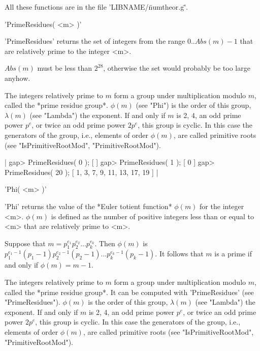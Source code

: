 All these functions are in the file 'LIBNAME/\"numtheor.g\"'.

%

'PrimeResidues( <m> )'

'PrimeResidues' returns the set of integers  from the range $0..Abs(m)-1$
that are relatively prime to the integer <m>.

$Abs(m)$ must be less than $2^{28}$, otherwise the set would probably  be
too large anyhow.

The integers  relatively prime to $m$ form  a group  under multiplication
modulo $m$,  called the *prime residue group*.   $\phi(m)$ (see "Phi") is
the order  of this  group, $\lambda(m)$ (see "Lambda")  the exponent.  If
and only if $m$ is 2, 4, an odd prime power $p^e$, or twice an  odd prime
power $2 p^e$, this group is cyclic.  In this case the generators  of the
group, i.e., elements of order $\phi(m)$, are called primitive roots (see
"IsPrimitiveRootMod", "PrimitiveRootMod").

|    gap> PrimeResidues( 0 );
    [  ]
    gap> PrimeResidues( 1 );
    [ 0 ]
    gap> PrimeResidues( 20 );
    [ 1, 3, 7, 9, 11, 13, 17, 19 ] |

%
%
%

'Phi( <m> )'

'Phi' returns the value of the *Euler totient function* $\phi(m)$ for the
integer <m>.  $\phi(m)$   is defined as the  number  of positive integers
less than or equal to <m> that are relatively prime to <m>.

Suppose that $m = p_1^{e_1} p_2^{e_2} ...  p_k^{e_k}$.  Then $\phi(m)$ is
$p_1^{e_1-1} (p_1-1)  p_2^{e_2-1} (p_2-1)  ...  p_k^{e_k-1} (p_k-1)$.  It
follows that $m$ is a prime if and only if $\phi(m) = m - 1$.

The  integers relatively prime  to $m$ form  a group under multiplication
modulo $m$, called  the *prime residue  group*.  It can be  computed with
'PrimeResidues'  (see "PrimeResidues").  $\phi(m)$  is the order of  this
group, $\lambda(m)$  (see "Lambda") the exponent.  If  and only if $m$ is
2, 4, an odd prime power $p^e$, or twice an odd prime power $2 p^e$, this
group is  cyclic.  In  this  case  the generators   of the   group, i.e.,
elements   of    order $\phi(m)$,   are   called   primitive  roots  (see
"IsPrimitiveRootMod", "PrimitiveRootMod").

